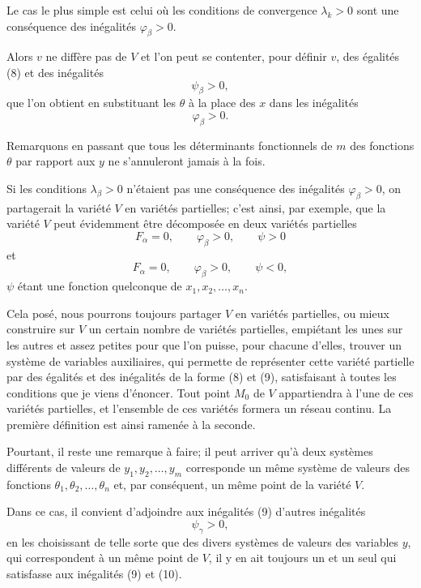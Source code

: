 \documentclass{article}
\begin{document}
Le cas le plus simple est celui où les conditions de convergence $\lambda_{k} > 0$ sont une conséquence des inégalités $\varphi_{\beta} > 0$.

Alors $v$ ne diffère pas de $V$ et l'on peut se contenter, pour définir $v$, des égalités (8) et des inégalités
\[
\psi_{\beta} > 0,
\tag{9}
\]
que l'on obtient en substituant les $\theta$ à la place des $x$ dans les inégalités
\[
\varphi_{\beta} > 0.
\]

Remarquons en passant que tous les déterminants fonctionnels de $m$ des fonctions $\theta$ par rapport aux $y$ ne s'annuleront jamais à la fois.

Si les conditions $\lambda_{\beta} > 0$ n'étaient pas une conséquence des inégalités $\varphi_{\beta} > 0$, on partagerait la variété $V$ en variétés partielles; c'est ainsi, par exemple, que la variété $V$ peut évidemment être décomposée en deux variétés partielles
\[
F_{\alpha} = 0, \qquad \varphi_{\beta} > 0, \qquad \psi > 0
\]
et
\[
F_{\alpha} = 0, \qquad \varphi_{\beta} > 0, \qquad \psi < 0,
\]
$\psi$ étant une fonction quelconque de $x_{1}, x_{2}, \ldots, x_{n}$.

Cela posé, nous pourrons toujours partager $V$ en variétés partielles, ou mieux construire sur $V$ un certain nombre de variétés partielles, empiétant les unes sur les autres et assez petites pour que l'on puisse, pour chacune d'elles, trouver un système de variables auxiliaires, qui permette de représenter cette variété partielle par des égalités et des inégalités de la forme (8) et (9), satisfaisant à toutes les conditions que je viens d'énoncer. Tout point $M_{0}$ de $V$ appartiendra à l'une de ces variétés partielles, et l'ensemble de ces variétés formera un réseau continu. La première définition est ainsi ramenée à la seconde.

Pourtant, il reste une remarque à faire; il peut arriver qu'à deux systèmes différents de valeurs de $y_{1}, y_{2}, \ldots, y_{m}$ corresponde un même système de valeurs des fonctions $\theta_{1}, \theta_{2}, \ldots, \theta_{n}$ et, par conséquent, un même point de la variété $V$.

Dans ce cas, il convient d'adjoindre aux inégalités (9) d'autres inégalités
\[
\psi_{\gamma} > 0,
\tag{10}
\]
en les choisissant de telle sorte que des divers systèmes de valeurs des
variables $y$, qui correspondent à un même point de $V$, il y en ait toujours un et un seul qui satisfasse aux inégalités (9) et (10).
\end{document}
